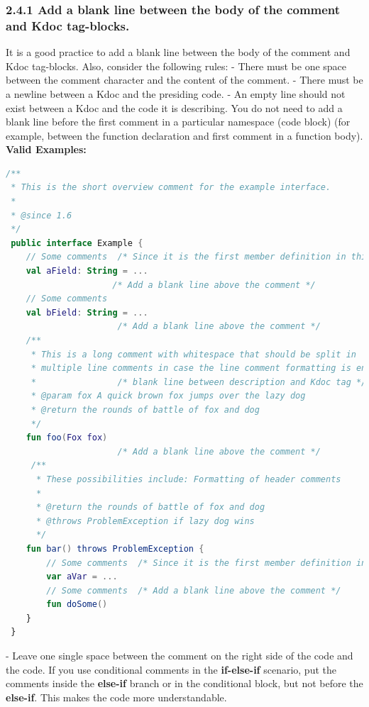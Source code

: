 \subsubsection*{\textbf{2.4.1 Add a blank line between the body of the comment and Kdoc tag-blocks.}}
\leavevmode\newline
\label{sec:2.4.1}
It is a good practice to add a blank line between the body of the comment and Kdoc tag-blocks. Also, consider the following rules:
- There must be one space between the comment character and the content of the comment.
- There must be a newline between a Kdoc and the presiding code.
- An empty line should not exist between a Kdoc and the code it is describing. You do not need to add a blank line before the first comment in a particular namespace (code block) (for example, between the function declaration and first comment in a function body).
\textbf{Valid Examples:}
\begin{lstlisting}[language=Kotlin]
/** 
 * This is the short overview comment for the example interface.
 * 
 * @since 1.6
 */
 public interface Example {
    // Some comments  /* Since it is the first member definition in this code block, there is no need to add a blank line here */
    val aField: String = ...
                     /* Add a blank line above the comment */
    // Some comments
    val bField: String = ...
                      /* Add a blank line above the comment */
    /**
     * This is a long comment with whitespace that should be split in 
     * multiple line comments in case the line comment formatting is enabled.
     *                /* blank line between description and Kdoc tag */
     * @param fox A quick brown fox jumps over the lazy dog
     * @return the rounds of battle of fox and dog 
     */
    fun foo(Fox fox)
                      /* Add a blank line above the comment */
     /**
      * These possibilities include: Formatting of header comments
      * 
      * @return the rounds of battle of fox and dog
      * @throws ProblemException if lazy dog wins
      */
    fun bar() throws ProblemException {
        // Some comments  /* Since it is the first member definition in this range, there is no need to add a blank line here */
        var aVar = ...
        // Some comments  /* Add a blank line above the comment */            
        fun doSome()
    }
 }
\end{lstlisting}
- Leave one single space between the comment on the right side of the code and the code. 
If you use conditional comments in the \textbf{if-else-if} scenario, put the comments inside the \textbf{else-if} branch or in the conditional block, but not before the \textbf{else-if}. This makes the code more understandable.
